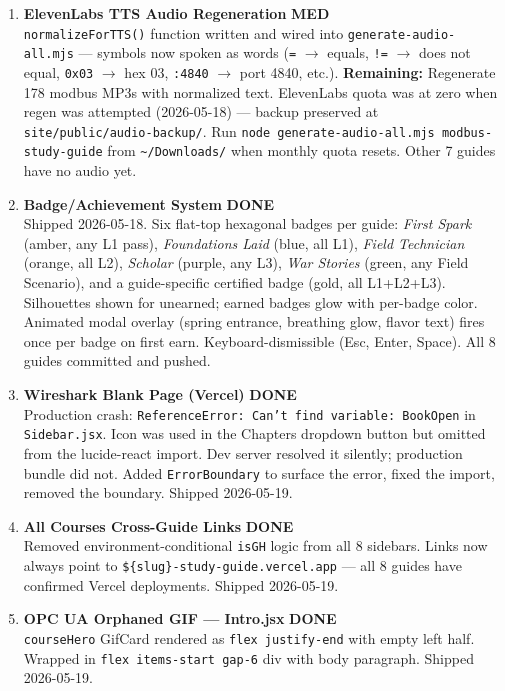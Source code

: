 \documentclass[10pt]{article}
\newcommand{\med}{\textcolor{samber}{\small\bfseries MED}}
\newcommand{\done}{\textcolor{sgreen}{\small\bfseries DONE}}
\begin{document}
\begin{enumerate}[resume]\small
  \item \textbf{ElevenLabs TTS Audio Regeneration} \hfill \med \\
    \texttt{normalizeForTTS()} function written and wired into \texttt{generate-audio-all.mjs} — symbols now spoken as words (\texttt{=} $\to$ equals, \texttt{!=} $\to$ does not equal, \texttt{0x03} $\to$ hex 03, \texttt{:4840} $\to$ port 4840, etc.). \textbf{Remaining:} Regenerate 178 modbus MP3s with normalized text. ElevenLabs quota was at zero when regen was attempted (2026-05-18) — backup preserved at \texttt{site/public/audio-backup/}. Run \texttt{node generate-audio-all.mjs modbus-study-guide} from \texttt{\textasciitilde/Downloads/} when monthly quota resets. Other 7 guides have no audio yet.

  \item \textbf{Badge/Achievement System} \hfill \done \\
    Shipped 2026-05-18. Six flat-top hexagonal badges per guide: \textit{First Spark} (amber, any L1 pass), \textit{Foundations Laid} (blue, all L1), \textit{Field Technician} (orange, all L2), \textit{Scholar} (purple, any L3), \textit{War Stories} (green, any Field Scenario), and a guide-specific certified badge (gold, all L1+L2+L3). Silhouettes shown for unearned; earned badges glow with per-badge color. Animated modal overlay (spring entrance, breathing glow, flavor text) fires once per badge on first earn. Keyboard-dismissible (Esc, Enter, Space). All 8 guides committed and pushed.

  \item \textbf{Wireshark Blank Page (Vercel)} \hfill \done \\
    Production crash: \texttt{ReferenceError: Can't find variable: BookOpen} in \texttt{Sidebar.jsx}. Icon was used in the Chapters dropdown button but omitted from the lucide-react import. Dev server resolved it silently; production bundle did not. Added \texttt{ErrorBoundary} to surface the error, fixed the import, removed the boundary. Shipped 2026-05-19.

  \item \textbf{All Courses Cross-Guide Links} \hfill \done \\
    Removed environment-conditional \texttt{isGH} logic from all 8 sidebars. Links now always point to \texttt{\$\{slug\}-study-guide.vercel.app} — all 8 guides have confirmed Vercel deployments. Shipped 2026-05-19.

  \item \textbf{OPC UA Orphaned GIF --- Intro.jsx} \hfill \done \\
    \texttt{courseHero} GifCard rendered as \texttt{flex justify-end} with empty left half. Wrapped in \texttt{flex items-start gap-6} div with body paragraph. Shipped 2026-05-19.


\end{enumerate}
\end{document}
